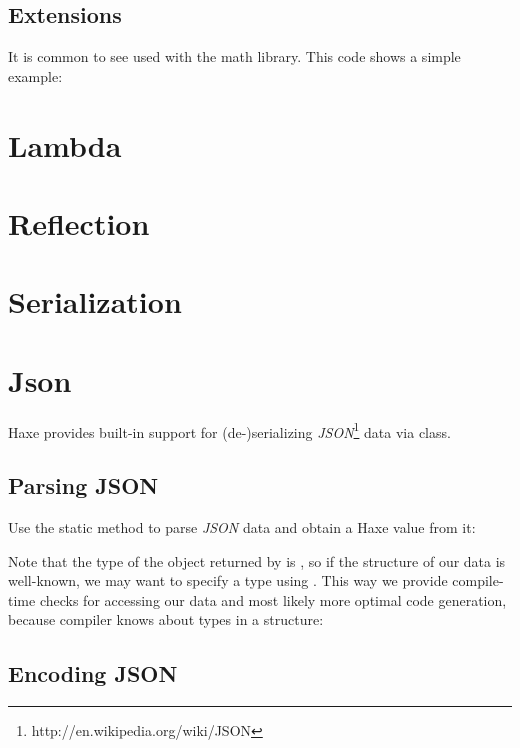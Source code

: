 \documentclass{haxe}
\begin{document}
\subsection{Extensions}
\label{std-math-extensions}
It is common to see  used with the math library.  This code shows a simple example:  


\section{Lambda}
\label{std-Lambda}

\section{Reflection}
\label{std-reflection}

\section{Serialization}
\label{std-serialization}

\section{Json}
\label{std-Json}

Haxe provides built-in support for (de-)serializing \emph{JSON}\footnote{http://en.wikipedia.org/wiki/JSON} data via  class.

\subsection{Parsing JSON}
\label{std-Json-parsing}

Use the  static method to parse \emph{JSON} data and obtain a Haxe value from it:

Note that the type of the object returned by  is , so if the structure of our data is well-known, we may want to specify a type using . This way we provide compile-time checks for accessing our data and most likely more optimal code generation, because compiler knows about types in a structure:

\subsection{Encoding JSON}
\label{std-Json-encoding}
\end{document}
